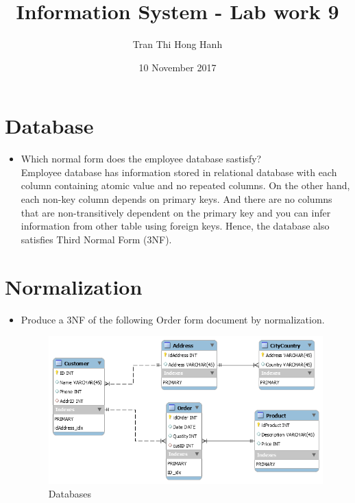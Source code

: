 \documentclass{article}
\title{Information System - Lab work 9}
\author{Tran Thi Hong Hanh}
\date{10 November 2017}
\begin{document}
\maketitle
\section*{Database}

\begin{itemize}
	\item Which normal form does the employee database sastisfy?\\
Employee database has information stored in relational database with each column containing atomic value and no repeated columns. 
On the other hand, each non-key column depends on primary keys. And there are no columns that are non-transitively dependent on the primary key and you can infer information from other table using foreign keys. Hence, the database also satisfies Third Normal Form (3NF).

\end{itemize}

\section*{Normalization}
\begin{itemize}
	\item Produce a 3NF of the following Order form document by normalization.
\begin{figure}[h]
\centering
\includegraphics[scale = 0.5]{schema.PNG}
\caption{Databases}
\end{figure}
\end{itemize}
\end{document}

